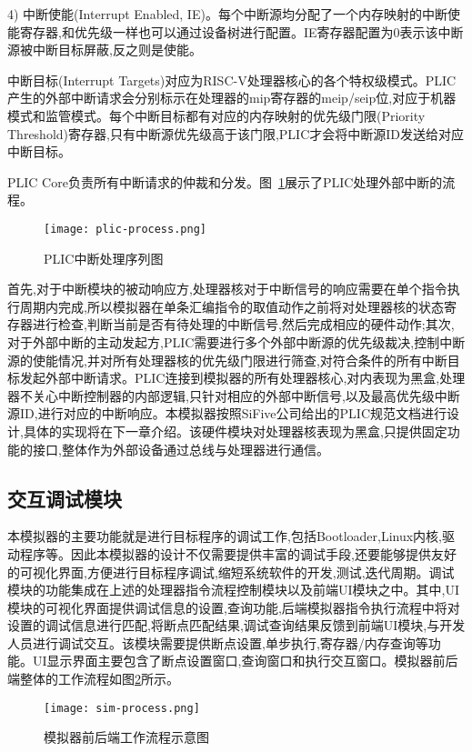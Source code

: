4) 中断使能(Interrupt Enabled, IE)。每个中断源均分配了一个内存映射的中断使能寄存器,和优先级一样也可以通过设备树进行配置。IE寄存器配置为0表示该中断源被中断目标屏蔽,反之则是使能。


中断目标(Interrupt Targets)对应为RISC-V处理器核心的各个特权级模式。PLIC产生的外部中断请求会分别标示在处理器的mip寄存器的meip/seip位,对应于机器模式和监管模式。每个中断目标都有对应的内存映射的优先级门限(Priority Threshold)寄存器,只有中断源优先级高于该门限,PLIC才会将中断源ID发送给对应中断目标。


PLIC Core负责所有中断请求的仲裁和分发。图~\ref{fig:plic-process}展示了PLIC处理外部中断的流程。
\begin{figure}[h]
    \centering
    \texttt{[image: plic-process.png]}
    \caption{PLIC中断处理序列图}
    \label{fig:plic-process}
\end{figure}

首先,对于中断模块的被动响应方,处理器核对于中断信号的响应需要在单个指令执行周期内完成,所以模拟器在单条汇编指令的取值动作之前将对处理器核的状态寄存器进行检查,判断当前是否有待处理的中断信号,然后完成相应的硬件动作;其次,对于外部中断的主动发起方,PLIC需要进行多个外部中断源的优先级裁决,控制中断源的使能情况,并对所有处理器核的优先级门限进行筛查,对符合条件的所有中断目标发起外部中断请求。PLIC连接到模拟器的所有处理器核心,对内表现为黑盒,处理器不关心中断控制器的内部逻辑,只针对相应的外部中断信号,以及最高优先级中断源ID,进行对应的中断响应。本模拟器按照SiFive公司给出的PLIC规范文档进行设计,具体的实现将在下一章介绍。该硬件模块对处理器核表现为黑盒,只提供固定功能的接口,整体作为外部设备通过总线与处理器进行通信。

\subsection{交互调试模块}
本模拟器的主要功能就是进行目标程序的调试工作,包括Bootloader,Linux内核,驱动程序等。因此本模拟器的设计不仅需要提供丰富的调试手段,还要能够提供友好的可视化界面,方便进行目标程序调试,缩短系统软件的开发,测试,迭代周期。调试模块的功能集成在上述的处理器指令流程控制模块以及前端UI模块之中。其中,UI模块的可视化界面提供调试信息的设置,查询功能,后端模拟器指令执行流程中将对设置的调试信息进行匹配,将断点匹配结果,调试查询结果反馈到前端UI模块,与开发人员进行调试交互。该模块需要提供断点设置,单步执行,寄存器/内存查询等功能。UI显示界面主要包含了断点设置窗口,查询窗口和执行交互窗口。模拟器前后端整体的工作流程如图\ref{fig:work-frame}所示。
\begin{figure}[H]
  \centering
  \texttt{[image: sim-process.png]}
  \caption{模拟器前后端工作流程示意图}
  \label{fig:work-frame}
\end{figure}


